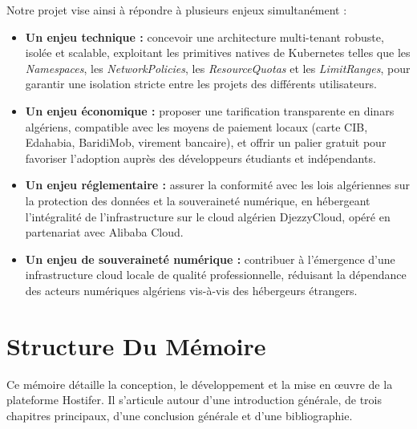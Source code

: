 Notre projet vise ainsi à répondre à plusieurs enjeux simultanément :
\begin{itemize}
    \item \textbf{Un enjeu technique :} concevoir une architecture multi-tenant robuste, isolée
    et scalable, exploitant les primitives natives de Kubernetes telles que les
    \textit{Namespaces}, les \textit{NetworkPolicies}, les \textit{ResourceQuotas} et les
    \textit{LimitRanges}, pour garantir une isolation stricte entre les projets des différents
    utilisateurs.

    \item \textbf{Un enjeu économique :} proposer une tarification transparente en dinars
    algériens, compatible avec les moyens de paiement locaux (carte CIB, Edahabia, BaridiMob,
    virement bancaire), et offrir un palier gratuit pour favoriser l'adoption auprès des
    développeurs étudiants et indépendants.

    \item \textbf{Un enjeu réglementaire :} assurer la conformité avec les lois algériennes
    sur la protection des données et la souveraineté numérique, en hébergeant l'intégralité
    de l'infrastructure sur le cloud algérien DjezzyCloud, opéré en partenariat avec
    Alibaba Cloud.

    \item \textbf{Un enjeu de souveraineté numérique :} contribuer à l'émergence d'une
    infrastructure cloud locale de qualité professionnelle, réduisant la dépendance des
    acteurs numériques algériens vis-à-vis des hébergeurs étrangers.
\end{itemize}

{\let\clearpage\relax \chapter*{Structure Du Mémoire}}

Ce mémoire détaille la conception, le développement et la mise en œuvre de la plateforme
Hostifer. Il s'articule autour d'une introduction générale, de trois chapitres principaux,
d'une conclusion générale et d'une bibliographie.

